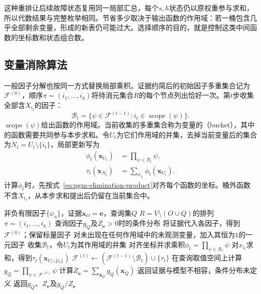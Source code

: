 这种重排让后续故障状态复用同一局部汇总，每个$s,h$状态仍以原权重参与求和，所以代数结果与完整枚举相同。节省多少取决于输出函数的作用域：若一桶包含几乎全部剩余变量，形成的新表仍可能过大。选择顺序的目的，就是控制这类中间函数的坐标数和状态组合数。

\subsection{变量消除算法}
\label{sec:pgm-elimination-ve-algorithm}

一般因子分解也按同一方式替换局部乘积。证据约简后的初始因子多重集合记为$\mathcal{F}^{(0)}$，顺序$\pi=(i_1,\ldots,i_k)$将待消元集合$R$的每个节点列出恰好一次。第$t$步收集全部含$X_{i_t}$的因子：
\[
  \mathcal{B}_t
  =\{\psi\in\mathcal{F}^{(t-1)}:
      i_t\in\operatorname{scope}(\psi)\}.
\]
$\operatorname{scope}(\psi)$给出函数的作用域。当前收集的多重集合称为变量的（bucket），其中的函数需要共同参与本步求和。令$U_t$为它们作用域的并集，去掉当前变量后的集合为$N_t=U_t\setminus\{i_t\}$，局部更新写为
\begin{equation}
  \begin{aligned}
    \phi_t(\bm{x}_{U_t})&=\prod_{\psi\in\mathcal{B}_t}\psi,\\
    \tau_t(\bm{x}_{N_t})&=\sum_{x_{i_t}}\phi_t(\bm{x}_{U_t}).
  \end{aligned}
  \label{eq:pgm-elimination-local-sum}
\end{equation}
计算$\phi_t$时，先按式~\eqref{eq:pgm-elimination-product}对齐每个函数的坐标。桶外函数不含$X_{i_t}$，从本步求和提出后仍留在当前集合中。

\begin{algorithm}[离散边缘概率的变量消除]
  \label{alg:pgm-elimination-marginal}
  \begin{algorithmic}[1]
    \Require 非负有限因子$\{\psi_a\}$，证据$\bm{x}_O=\bm{e}$，查询集$Q$
    \Require $R=V\setminus(O\cup Q)$的排列$\pi=(i_1,\ldots,i_k)$
    \Ensure 查询因子$g_Q$及$Z_{\bm{e}}>0$时的条件分布
    \State 将证据代入各因子，得到$\mathcal{F}^{(0)}$；保留标量因子
    \State 对未出现在任何作用域中的未观测变量，加入其恒为$1$的一元因子
      \State 收集$\mathcal{B}_t$，令$U_t$为其作用域的并集
      \State 对齐坐标并求乘积$\phi_t=\prod_{\psi\in\mathcal{B}_t}\psi$
      \State 对$x_{i_t}$求和，得到$\tau_t(\bm{x}_{U_t\setminus\{i_t\}})$
      \State $\mathcal{F}^{(t)}\gets
        (\mathcal{F}^{(t-1)}\setminus\mathcal{B}_t)\cup\{\tau_t\}$
    \EndFor
    \State 在查询取值空间上计算$g_Q=\prod_{\psi\in\mathcal{F}^{(k)}}\psi$
    \State 计算$Z_{\bm{e}}=\sum_{\bm{x}_Q}g_Q(\bm{x}_Q)$
      \State 返回证据与模型不相容，条件分布未定义
    \Else
      \State 返回$g_Q$、$Z_{\bm{e}}$及$g_Q/Z_{\bm{e}}$
    \EndIf
  \end{algorithmic}
\end{algorithm}


